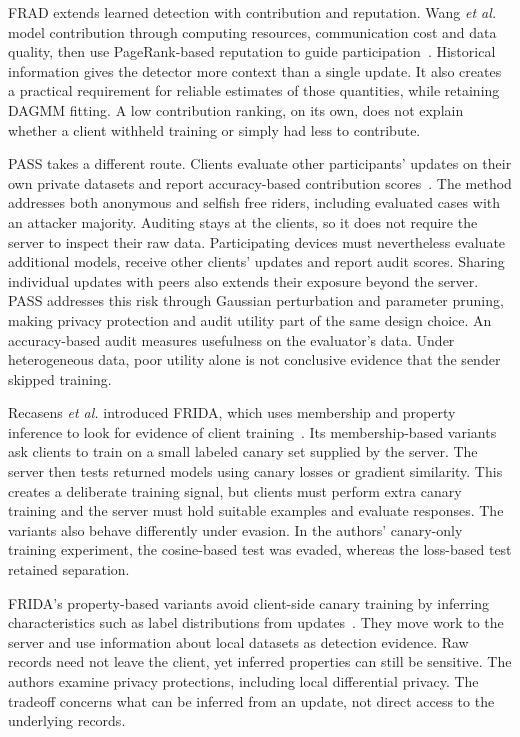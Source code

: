 \documentclass[conference]{IEEEtran}
\makeatletter
\renewcommand{\subsection}{\@startsection{subsection}{2}{\z@}{1.5ex}{0.7ex}{\normalfont\normalsize\itshape}}
\makeatother
\begin{document}
FRAD extends learned detection with contribution and reputation.
Wang \emph{et al.} model contribution through computing resources,
communication cost and data quality, then use PageRank-based reputation
to guide participation~\cite{wang2024frad}. Historical information gives
the detector more context than a single update. It also creates a practical
requirement for reliable estimates of those quantities, while retaining
DAGMM fitting. A low contribution ranking, on its own, does not explain
whether a client withheld training or simply had less to contribute.

PASS takes a different route. Clients evaluate other participants' updates
on their own private datasets and report accuracy-based contribution
scores~\cite{wang2024pass}. The method addresses both anonymous and selfish
free riders, including evaluated cases with an attacker majority. Auditing
stays at the clients, so it does not require the server to inspect their raw
data. Participating devices must nevertheless evaluate additional models,
receive other clients' updates and report audit scores. Sharing individual
updates with peers also extends their exposure beyond the server. PASS
addresses this risk through Gaussian perturbation and parameter pruning,
making privacy protection and audit utility part of the same design choice.
An accuracy-based audit measures usefulness on the evaluator's data.
Under heterogeneous data, poor utility alone is not conclusive evidence
that the sender skipped training.

\subsection{Canary-Based Evidence and Privacy Tradeoffs}
Recasens \emph{et al.} introduced FRIDA, which uses membership and property
inference to look for evidence of client
training~\cite{recasens2026frida}. Its membership-based variants ask clients
to train on a small labeled canary set supplied by the server. The server
then tests returned models using canary losses or gradient similarity.
This creates a deliberate training signal, but clients must perform extra
canary training and the server must hold suitable examples and evaluate
responses. The variants also behave differently under evasion. In the
authors' canary-only training experiment, the cosine-based test was evaded,
whereas the loss-based test retained separation.

FRIDA's property-based variants avoid client-side canary training by
inferring characteristics such as label distributions from
updates~\cite{recasens2026frida}. They move work to the server and use
information about local datasets as detection evidence. Raw records need
not leave the client, yet inferred properties can still be sensitive.
The authors examine privacy protections, including local differential
privacy. The tradeoff concerns what can be inferred from an update, not
direct access to the underlying records.
\end{document}
